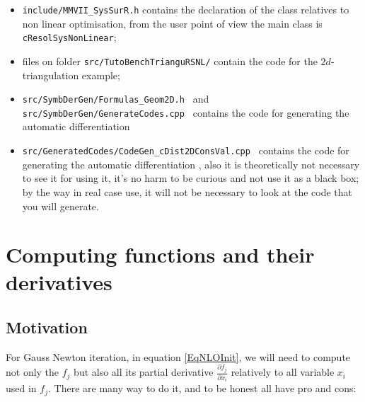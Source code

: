 \begin{itemize}
    \item {\tt include/MMVII\_SysSurR.h} contains the declaration of the class relatives to
          non linear optimisation, from the user point of view the main class
          is {\tt  cResolSysNonLinear};

    \item files on folder {\tt src/TutoBenchTrianguRSNL/} contain the code for the $2d$-triangulation
          example;

    \item {\tt src/SymbDerGen/Formulas\_Geom2D.h } and {\tt src/SymbDerGen/GenerateCodes.cpp } 
          contains the code for generating the automatic differentiation 

    \item {\tt src/GeneratedCodes/CodeGen\_cDist2DConsVal.cpp } contains the code for 
          generating the automatic differentiation , also it is theoretically not necessary 
          to see it for using it, it's no harm to be curious and not use it as a black box;
          by the way in real case use, it will not be necessary to look at the code that you
          will generate.
\end{itemize}


\section{Computing functions and their derivatives}
\label{Compute:Deriv:SysNL}

\subsection{Motivation}

For Gauss Newton iteration, in equation \ref{EqNLOInit}, we will need to compute not only
the $f_j$ but also all its partial derivative $\frac{\partial f_j}{\partial x_i}$
relatively to all variable $x_i$ used in $f_j$.  There are many way to do it,
and to be honest  all have  pro and cons:


